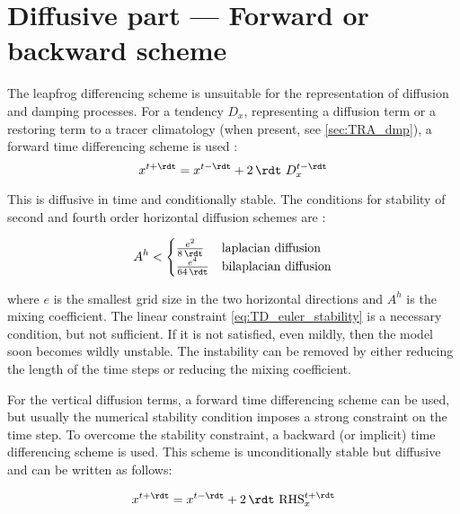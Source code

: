 \documentclass[../main/NEMO_manual]{subfiles}
\begin{document}
\section{Diffusive part --- Forward or backward scheme}
\label{sec:TD_forward_imp}

The leapfrog differencing scheme is unsuitable for
the representation of diffusion and damping processes.
For a tendency $D_x$, representing a diffusion term or a restoring term to a tracer climatology
(when present, see \autoref{sec:TRA_dmp}), a forward time differencing scheme is used :
\[
  x^{t + \rdt} = x^{t - \rdt} + 2 \, \rdt \ D_x^{t - \rdt}
\]

This is diffusive in time and conditionally stable.
The conditions for stability of second and fourth order horizontal diffusion schemes are
\citep{griffies_bk04}:

\begin{equation}
  \label{eq:TD_euler_stability}
  A^h <
  \begin{cases}
    \frac{e^2}{ 8 \, \rdt} & \text{laplacian diffusion} \\
    \frac{e^4}{64 \, \rdt} & \text{bilaplacian diffusion}
  \end{cases}
\end{equation}

where $e$ is the smallest grid size in the two horizontal directions and
$A^h$ is the mixing coefficient.
The linear constraint \autoref{eq:TD_euler_stability} is a necessary condition, but not sufficient.
If it is not satisfied, even mildly, then the model soon becomes wildly unstable.
The instability can be removed by either reducing the length of the time steps or
reducing the mixing coefficient.

For the vertical diffusion terms, a forward time differencing scheme can be used,
but usually the numerical stability condition imposes a strong constraint on the time step.
To overcome the stability constraint, a backward (or implicit) time differencing scheme is used.
This scheme is unconditionally stable but diffusive and can be written as follows:

\begin{equation}
  \label{eq:TD_imp}
  x^{t + \rdt} = x^{t - \rdt} + 2 \, \rdt \ \text{RHS}_x^{t + \rdt}
\end{equation}

\end{document}
